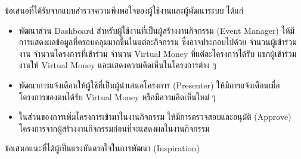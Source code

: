 ข้อเสนอที่ได้รับจากแบบสำรวจความพึงพอใจของผู้ใช้งานและผู้พัฒนาระบบ ได้แก่
\begin{itemize}
      \item พัฒนาส่วน Dashboard สำหรับผู้ใช้งานที่เป็นผู้สร้างงานกิจกรรม (Event Manager) ให้มีการแสดงผลข้อมูลที่ครอบคลุมมากขึ้นในแต่ละกิจกรรม ซึ่งอาจประกอบไปด้วย จำนวนผู้เข้าร่วมงาน จำนวนโครงการที่เข้าร่วม จำนวน Virtual Money ที่แต่ละโครงการได้รับ แขกผู้เข้าร่วมงานให้ Virtual Money และแสดงความคิดเห็นในโครงการต่าง ๆ
      \item พัฒนาการแจ้งเตือนให้ผู้ใช้ที่เป็นผู้นำเสนอโครงการ (Presenter) ให้มีการแจ้งเตือนเมื่อโครงการของตนได้รับ Virtual Money หรือมีความคิดเห็นใหม่ ๆ
      \item ในส่วนของการเพิ่มโครงการเข้ามาในงานกิจกรรม ให้มีการตรวจสอบและอนุมัติ (Approve) โครงการจากผู้สร้างงานกิจกรรมก่อนที่จะแสดงผลในงานกิจกรรม
\end{itemize}

ข้อเสนอแนะที่ได้ผู้เป็นแรงบันดาลใจในการพัฒนา (Inspiration)


